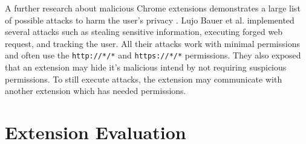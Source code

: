 	A further research about malicious Chrome extensions demonstrates a large list of possible attacks to harm the user's privacy \cite{extensions:cns14}. Lujo Bauer et al. implemented several attacks such as stealing sensitive information, executing forged web request, and tracking the user. All their attacks work with minimal permissions and often use the \texttt{http://*/*} and \texttt{https://*/*} permissions. They also exposed that an extension may hide it's malicious intend by not requiring suspicious permissions. To still execute attacks, the extension may communicate with another extension which has needed permissions. \\
	
	
	
\section{Extension Evaluation} 
	
